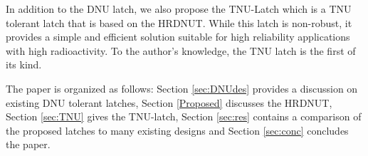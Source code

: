 In addition to the DNU latch, we also propose the  TNU-Latch which is a TNU tolerant latch that is based on the HRDNUT. While this latch is non-robust, it provides a simple and efficient solution suitable for high reliability applications with high radioactivity. To the author's knowledge, the TNU latch is the first of its kind.  

The paper is organized as follows: Section \ref{sec:DNUdes} provides a discussion on existing DNU tolerant latches, Section \ref{Proposed} discusses the HRDNUT, Section \ref{sec:TNU} gives the TNU-latch, Section \ref{sec:res} contains a comparison of the proposed latches to many existing designs and Section \ref{sec:conc} concludes the paper.